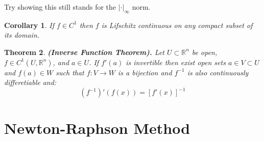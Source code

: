 \documentclass[11pt,a4paper]{article}
\theoremstyle{definition}
\theoremstyle{plain}
\newtheorem{theorem}{Theorem}[section]
\newtheorem{corollary}[theorem]{Corollary}
\newcommand{\R}{\mathbb{R}}
\renewcommand{\tt}[1]{\textnormal{\textbf{(#1).}}} %
\begin{document}
	\noindent Try showing this still stands for the $|\cdot|_\infty$ norm.
	\begin{corollary}
		If $f \in C^1$ then $f$ is Lifschitz continuous on any compact
		subset of its domain.
	\end{corollary}
	\begin{theorem}
	\tt{Inverse Function Theorem}
	Let $U \subset \R^n$ be open,
	$f \in C^1(U,\R^n)$, and $a \in U$. If $f'(a)$ is invertible then
	exist open sets $a \in V \subset U$ and $f(a) \in W$ such that
	$f \colon V \to W$ is a bijection and $f^{-1}$ is also continuously 
	differetiable and:
	\[
		(f^{-1})'(f(x)) = [f'(x)]^{-1}
	\]
	\end{theorem}
	
	
	\newpage
	
	\section{Newton-Raphson Method}
	
	\newpage
	
\end{document}
